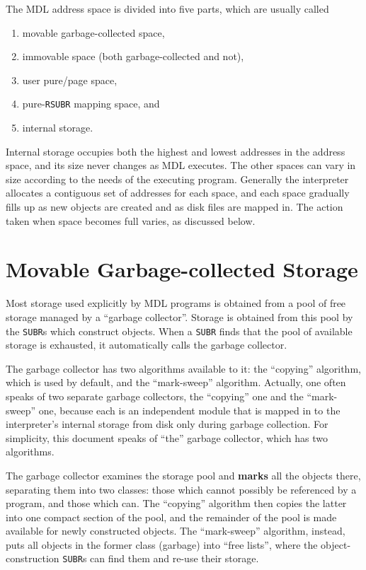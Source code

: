 \documentclass[a4paper]{scrbook}
\providecommand{\tightlist}{%
  \setlength{\itemsep}{0pt}\setlength{\parskip}{0pt}}
\begin{document}
The MDL address space is divided into five parts, which are usually called

\begin{enumerate}
\def\labelenumi{\arabic{enumi}.}
\tightlist
\item
  movable garbage-collected space,
\item
  immovable space (both garbage-collected and not),
\item
  user pure/page space,
\item
  pure-\texttt{RSUBR} mapping space, and
\item
  internal storage.
\end{enumerate}

Internal storage occupies both the highest and lowest addresses in the address space, and its size never changes as MDL
executes. The other spaces can vary in size according to the needs of the executing program. Generally the interpreter
allocates a contiguous set of addresses for each space, and each space gradually fills up as new objects are created and as
disk files are mapped in. The action taken when space becomes full varies, as discussed below.

\section{Movable Garbage-collected Storage}\label{movable-garbage-collected-storage}

Most storage used explicitly by MDL programs is obtained from a pool of free storage managed by a ``garbage collector''.
Storage is obtained from this pool by the \texttt{SUBR}s which construct objects. When a \texttt{SUBR} finds that the pool
of available storage is exhausted, it automatically calls the garbage collector.

The garbage collector has two algorithms available to it: the ``copying'' algorithm, which is used by default, and the
``mark-sweep'' algorithm. Actually, one often speaks of two separate garbage collectors, the ``copying'' one and the
``mark-sweep'' one, because each is an independent module that is mapped in to the interpreter's internal storage from disk
only during garbage collection. For simplicity, this document speaks of ``the'' garbage collector, which has two
algorithms.

The garbage collector examines the storage pool and \textbf{marks} all the objects there, separating them into two classes:
those which cannot possibly be referenced by a program, and those which can. The ``copying'' algorithm then copies the
latter into one compact section of the pool, and the remainder of the pool is made available for newly constructed objects.
The ``mark-sweep'' algorithm, instead, puts all objects in the former class (garbage) into ``free lists'', where the
object-construction \texttt{SUBR}s can find them and re-use their storage.
\end{document}
